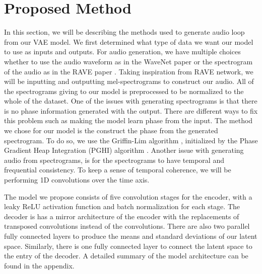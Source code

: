 \documentclass{article}
\begin{document}

\newpage


\section{Proposed Method}


In this section, we will be describing the methods used to generate audio loop from our VAE model. 
We first determined what type of data we want our model to use as inputs and outputs. For audio generation, we have multiple choices whether to use the audio waveform as in the WaveNet paper \cite{oord2016wavenet} or the spectrogram of the audio as in the RAVE paper \cite{caillonRAVEVariationalAutoencoder2021}. Taking inspiration from RAVE network, we will be inputting and outputting mel-spectrograms to construct our audio. All of the spectrograms giving to our model is preprocessed to be normalized to the whole of the dataset. One of the issues with generating spectrograms is that there is no phase information generated with the output. There are different ways to fix this problem such as making the model learn phase from the input. The method we chose for our model is the construct the phase from the generated spectrogram. To do so, we use the Griffin-Lim algorithm \cite{griff1984}, initialized by the Phase Gradient Heap Integration (PGHI) algorithm \cite{pghi2017}.
Another issue with generating audio from spectrograms, is for the spectrograms to have temporal and frequential consistency. To keep a sense of temporal coherence, we will be performing 1D convolutions over the time axis.

The model we propose consists of five convolution stages for the encoder, with a leaky ReLU activation function and batch normalization for each stage. The decoder is has a mirror architecture of the encoder with the replacements of transposed convolutions instead of the convolutions. There are also two parallel fully connected layers to produce the means and standard deviations of our latent space. Similarly, there is one fully connected layer to connect the latent space to the entry of the decoder. A detailed summary of the model architecture can be found in the appendix.
\end{document}
